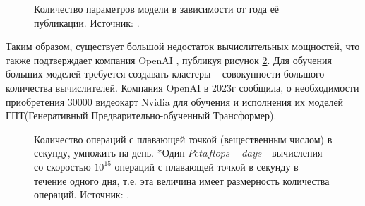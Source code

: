 \begin{figure}[htbp]
	\caption{Количество параметров модели в зависимости от года её публикации. Источник: \cite{bernstein2021freely}.}
	\label{ris:ParametersANN}
\end{figure}
Таким образом, существует большой недостаток вычислительных мощностей, что также подтверждает компания OpenAI \cite{openai_website}, публикуя рисунок \ref{ris:OpenAI}. Для обучения больших моделей требуется создавать кластеры -- совокупности большого количества вычислителей. Компания OpenAI в 2023г сообщила, о необходимости приобретения $30000$ видеокарт Nvidia для обучения и исполнения их моделей ГПТ(Генеративный Предварительно-обученный Трансформер).
\begin{figure}[htbp]
	\caption{
		Количество операций с плавающей точкой (вещественным числом) в секунду, умножить на день.
		*Один $Petaflops-days$ - вычисления со скоростью $10^{15}$ операций с плавающей точкой в секунду в течение одного дня, т.е. эта величина имеет размерность количества операций. Источник: \cite{openai_website}.}
	\label{ris:OpenAI}
\end{figure}
